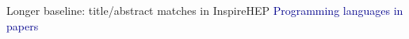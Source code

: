 \documentclass[aspectratio=169]{beamer}
\begin{document}
\begin{frame}{Longer baseline: title/abstract matches in InspireHEP}
\vspace{0.35 cm}
\textcolor{darkblue}{Programming languages in  papers}

\begin{columns}
\end{columns}
\end{frame}
\end{document}
